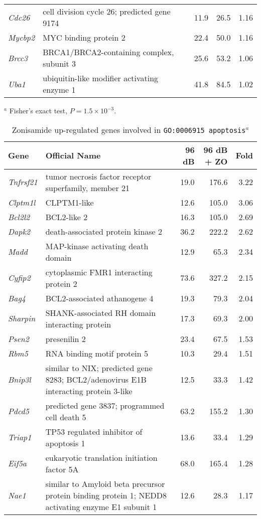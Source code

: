 \documentclass{article}
\begin{document}
\begin{table}
\begin{small}
\begin{tabular}{l p{2.5in }rrr}
{\it Cdc26}&cell division cycle 26; predicted gene 9174&11.9&26.5&1.16\\
{\it Mycbp2}&MYC binding protein 2&22.4&50.0&1.16\\
{\it Brcc3}&BRCA1/BRCA2-containing complex, subunit 3&25.6&53.2&1.06\\
{\it Uba1}&ubiquitin-like modifier activating enzyme 1&41.8&84.5&1.02\\
\hline
\end{tabular}
$^a$ Fisher's exact test, $P=1.5\times 10^{-3}$.
\end{small}
\label{tab:zoupcat}
\end{table}

\begin{table} 
\caption{Zonisamide up-regulated genes involved in \texttt{GO:0006915~apoptosis}$^a$}
\begin{small}
\begin{tabular}{l p{2.5in }rrr}
  \hline
 Gene& Official Name & 96 dB & 96 dB + ZO & Fold \\ 
  \hline
{\it Tnfrsf21}&tumor necrosis factor receptor superfamily, member 21&19.0&176.6&3.22\\
{\it Clptm1l}&CLPTM1-like&12.6&105.0&3.06\\
{\it Bcl2l2}&BCL2-like 2&16.3&105.0&2.69\\
{\it Dapk2}&death-associated protein kinase 2&36.2&222.2&2.62\\
{\it Madd}&MAP-kinase activating death domain&12.9&65.3&2.34\\
{\it Cyfip2}&cytoplasmic FMR1 interacting protein 2&73.6&327.2&2.15\\
{\it Bag4}&BCL2-associated athanogene 4&19.3&79.3&2.04\\
{\it Sharpin}&SHANK-associated RH domain interacting protein&17.3&69.3&2.00\\
{\it Psen2}&presenilin 2&23.4&67.5&1.53\\
{\it Rbm5}&RNA binding motif protein 5&10.3&29.4&1.51\\
{\it Bnip3l}&similar to NIX; predicted gene 8283; BCL2/adenovirus E1B interacting protein 3-like&12.5&33.3&1.42\\
{\it Pdcd5}&predicted gene 3837; programmed cell death 5&63.2&155.2&1.30\\
{\it Triap1}&TP53 regulated inhibitor of apoptosis 1&13.6&33.4&1.29\\
{\it Eif5a}&eukaryotic translation initiation factor 5A&68.0&165.4&1.28\\
{\it Nae1}&similar to Amyloid beta precursor protein binding protein 1; NEDD8 activating enzyme E1 subunit 1&12.6&28.3&1.17\\

\end{tabular}
\end{small}
\end{table}
\end{document}
